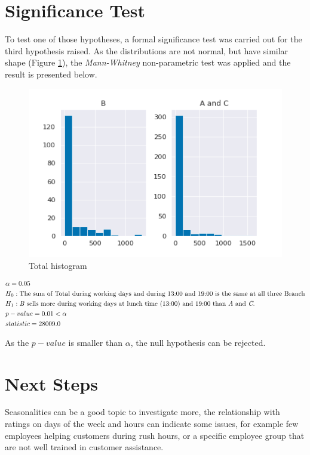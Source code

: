 \documentclass[11pt, a4]{article}
\begin{document}
\section*{Significance Test}

To test one of those hypotheses, a formal significance test was carried out for the third hypothesis raised. As the distributions are not normal, but have similar shape (Figure \ref{fig:test}), the \textit{Mann-Whitney} non-parametric test was applied and the result is presented below. 

\begin{figure}
\includegraphics[]{test}
\centering
\caption{Total histogram}
\label{fig:test}
\end{figure}

\begin{align*}
&\alpha = 0.05\\
&H_0: \text{The sum of Total during working days and during 13:00 and 19:00 is the same at all three Branch}  \\
&H_1:\text{\textit{B} sells more during working days at lunch time (13:00) and 19:00 than \textit{A} and \textit{C}.}\\
& p-value=0.01 < \alpha\\
& statistic=28009.0\\
\end{align*}

As the $p-value$ is smaller than $\alpha$, the null hypothesis can be rejected.

\section*{Next Steps}

Seasonalities can be a good topic to investigate more, the relationship with ratings on days of the week and hours can indicate some issues, for example few employees helping customers during rush hours, or a specific employee group that are not well trained in customer assistance.
\end{document}
